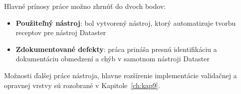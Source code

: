 Hlavné prínosy práce možno zhrnúť do dvoch bodov:
\begin{itemize}
    \item \textbf{Použiteľný nástroj}: bol vytvorený nástroj, ktorý automatizuje tvorbu receptov pre nástroj Dataster
    \item \textbf{Zdokumentované defekty}: práca prináša presnú identifikáciu a dokumentáciu obmedzení a chýb v samotnom nástroji Dataster
\end{itemize}

Možnosti ďalšej práce nástroja, hlavne rozšírenie implementácie validačnej a opravnej vrstvy sú rozobrané v Kapitole~\ref{ch:kap9}.

